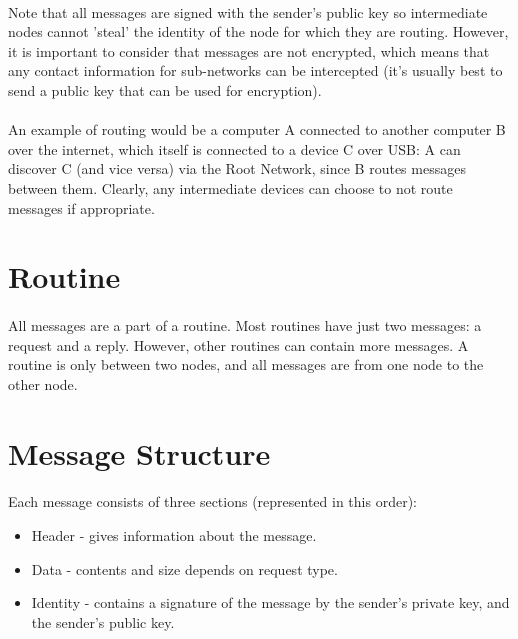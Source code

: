 \documentclass{article}
\begin{document}
\paragraph{}
Note that all messages are signed with the sender's public key so intermediate nodes cannot 'steal' the identity of the node for which they are routing. However, it is important to consider that messages are not encrypted, which means that any contact information for sub-networks can be intercepted (it's usually best to send a public key that can be used for encryption).

\paragraph{}
An example of routing would be a computer A connected to another computer B over the internet, which itself is connected to a device C over USB: A can discover C (and vice versa) via the Root Network, since B routes messages between them. Clearly, any intermediate devices can choose to not route messages if appropriate.

\section{Routine}

\paragraph{}
All messages are a part of a routine. Most routines have just two messages: a request and a reply. However, other routines can contain more messages. A routine is only between two nodes, and all messages are from one node to the other node.

\section{Message Structure}

\paragraph{}
Each message consists of three sections (represented in this order):

\begin{itemize}
\item Header - gives information about the message.
\item Data - contents and size depends on request type.
\item Identity - contains a signature of the message by the sender's private key, and the sender's public key.
\end{itemize}
\end{document}

